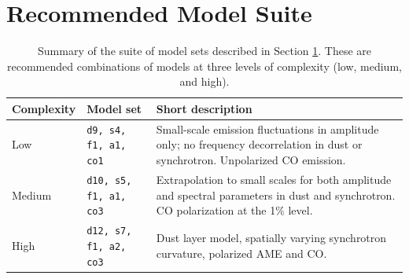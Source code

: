 \documentclass[twocolumn]{aastex631}
\newcommand{\giuse}[1]{\textcolor{orange}{(GP: #1)}}
\begin{document}




\section{Recommended Model Suite}\label{sec:modelsuite}

\begin{table}
    \centering
    \begin{tabular}{p{} p{} p{}}
    
    \toprule 
    Complexity & Model set & Short description \\
    \midrule
    Low  & \texttt{d9, s4, f1, a1, co1} & Small-scale emission fluctuations in amplitude only; no frequency decorrelation in dust or synchrotron. Unpolarized CO emission.   \\
    Medium  & \texttt{d10, s5, f1, a1, co3} & Extrapolation to small scales for both amplitude and spectral parameters in dust and synchrotron. CO polarization at the 1\% level.  \\
    High  & \texttt{d12, s7, f1, a2, co3} & Dust layer model, spatially varying synchrotron curvature, polarized AME and CO.  \\
   
   \bottomrule
    \end{tabular}
    \caption{Summary of the suite of model sets described in Section \ref{sec:modelsuite}. These are recommended combinations of models at three levels of complexity (low, medium, and high).  }
    \label{tab:modelsuite}
\end{table}
\end{document}
